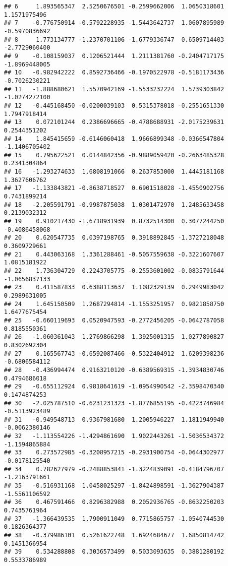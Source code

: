 \documentclass[
]{article}
\begin{document}
\begin{verbatim}
## 6     1.893565347  2.5250676501 -0.2599662006  1.0650318601  1.1571975496
## 7    -0.776750914 -0.5792228935 -1.5443642737  1.0607895989 -0.5970836692
## 8     1.773134777 -1.2370701106 -1.6779336747  0.6509714403 -2.7729060400
## 9    -0.108159037  0.1206521444  1.2111381760 -0.2404717175 -1.8969448005
## 10   -0.982942222  0.8592736466 -0.1970522978 -0.5181173436 -0.7026230221
## 11   -1.888680621  1.5570942169 -1.5533232224  1.5739303842 -1.0274272100
## 12   -0.445168450 -0.0200039103  0.5315378018 -0.2551651330  1.7947918414
## 13    0.072101244  0.2386696665 -0.4788688931 -2.0175239631  0.2544351202
## 14    1.845415659 -0.6146060418  1.9666899348 -0.0366547804 -1.1406705402
## 15    0.795622521  0.0144842356 -0.9889059420 -0.2663485328  0.2341304864
## 16   -1.293274633  1.6808191066  0.2637853000  1.4445181168  1.3627606762
## 17   -1.133843821 -0.8638718527  0.6901518028 -1.4550902756  0.7431899214
## 18   -2.205591791 -0.9987875038  1.0301472970  1.2485633458  0.2139032312
## 19    0.910217430 -1.6718931939  0.8732514300  0.3077244250 -0.4086458068
## 20    0.620547735  0.0397198765  0.3918892845 -1.3727218048  0.3609729661
## 21    0.443063168  1.3361288461 -0.5057559638 -0.3221607607  1.0815181922
## 22    1.736304729  0.2243705775 -0.2553601002 -0.0835791644 -1.0656837133
## 23    0.411587833  0.6388113637  1.1082329139  0.2949983042  0.2989631005
## 24    1.645150509  1.2687294814 -1.1553251957  0.9821858750  1.6477675454
## 25   -0.660119693  0.0520947593 -0.2772456205 -0.0642787058  0.8185550361
## 26   -1.060361043  1.2769866298  1.3925001315  1.0277890827  0.8302692304
## 27    0.165567743 -0.6592087466 -0.5322404912  1.6209398236 -0.6806584112
## 28   -0.436994474  0.9163210120 -0.6389569315 -1.3934830746  0.4794686018
## 29   -0.655112924  0.9818641619 -1.0954990542 -2.3598470340  0.1474874253
## 30   -2.025787510 -0.6231231323 -1.8776855195 -0.4223746984 -0.5113923489
## 31   -0.949548713  0.9367981680  1.2005946227  1.1811949940 -0.0062380146
## 32   -1.113554226 -1.4294861690  1.9022443261 -1.5036534372 -1.1594865884
## 33    0.273572985 -0.3208957215 -0.2931900754 -0.0644302977 -0.0178125540
## 34    0.782627979 -0.2488853841 -1.3224839091 -0.4184796707 -1.2163791661
## 35   -0.516931168  1.0458025297 -1.8424898591 -1.3627904387 -1.5561106592
## 36    0.467591466  0.8296382988  0.2052936765 -0.8632250203  0.7435761964
## 37   -1.366439535  1.7900911049  0.7715865757 -1.0540744530  0.1826364377
## 38   -0.379986101  0.5261622748  1.6924684677  1.6850814742  0.1451366954
## 39    0.534288808  0.3036573499  0.5033093635  0.3881280192  0.5533786989

\end{verbatim}
\end{document}

